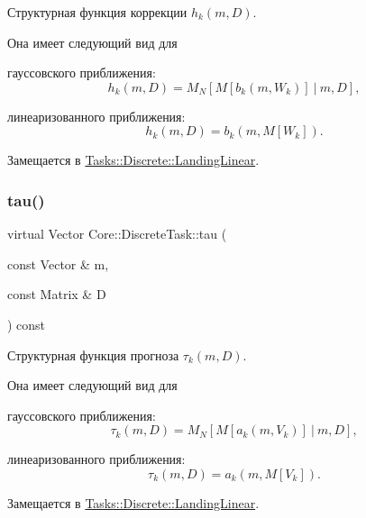 Структурная функция коррекции $h_k(m, D)$. 

Она имеет следующий вид для


\begin{DoxyItemize}
\item гауссовского приближения\+: \[h_k(m, D) = M_N[M[b_k(m, W_k)] \ |\ m, D],\]
\item линеаризованного приближения\+: \[h_k(m, D) = b_k(m, M[W_k]).\] 
\end{DoxyItemize}

Замещается в \hyperlink{class_tasks_1_1_discrete_1_1_landing_linear_a9b1f90547fca3b460b48693b2e16219a}{Tasks\+::\+Discrete\+::\+Landing\+Linear}.

\hypertarget{class_core_1_1_discrete_task_aed780d7286bc88d0a2debb585601b3ca}{}\label{class_core_1_1_discrete_task_aed780d7286bc88d0a2debb585601b3ca} 
\subsubsection{\texorpdfstring{tau()}{tau()}}
{\footnotesize\ttfamily virtual Vector Core\+::\+Discrete\+Task\+::tau (\begin{DoxyParamCaption}\item[{const Vector \&}]{m,  }\item[{const Matrix \&}]{D }\end{DoxyParamCaption}) const\hspace{0.3cm}{\ttfamily [pure virtual]}}



Структурная функция прогноза $\tau_k(m, D)$. 

Она имеет следующий вид для


\begin{DoxyItemize}
\item гауссовского приближения\+: \[\tau_k(m, D) = M_N[M[a_k(m, V_k)] \ |\ m, D],\]
\item линеаризованного приближения\+: \[\tau_k(m, D) = a_k(m, M[V_k]).\] 
\end{DoxyItemize}

Замещается в \hyperlink{class_tasks_1_1_discrete_1_1_landing_linear_a8f2022967fae3dde3e7d2df3f7fa98f8}{Tasks\+::\+Discrete\+::\+Landing\+Linear}.

\hypertarget{class_core_1_1_discrete_task_a18906155257c5febd937f2f0c633e5ed}{}\label{class_core_1_1_discrete_task_a18906155257c5febd937f2f0c633e5ed} 
